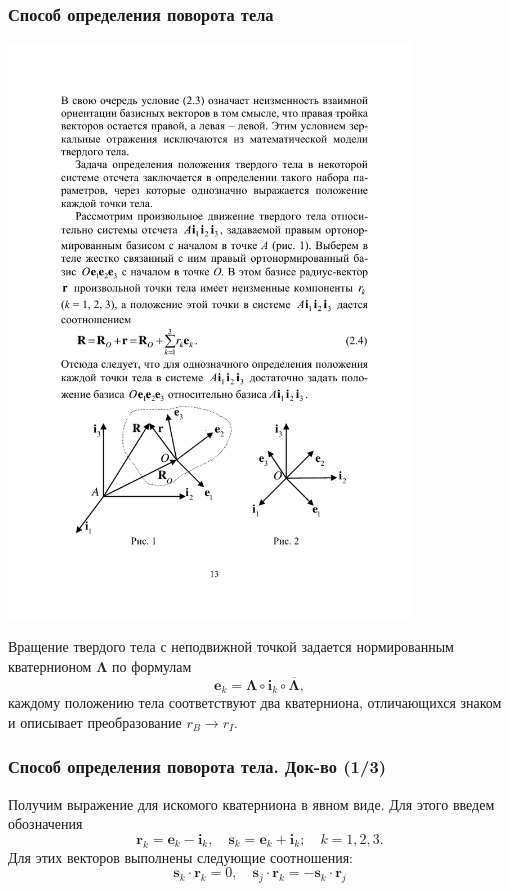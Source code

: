 \documentclass[utf8]{beamer}
\begin{document}
\begin{frame}
\frametitle{Способ определения поворота тела}
\begin{center}
\includegraphics[width=0.8\textwidth]{pic/BI_notations.pdf}
\end{center}
Вращение твердого тела с неподвижной точкой задается нормированным
кватернионом $\mathbf{\Lambda}$ по формулам
$$
\mathbf{e}_k =
\mathbf{\Lambda}\circ\mathbf{i}_k\circ\overline{\mathbf{\Lambda}},
$$
каждому положению тела соответствуют два кватерниона, отличающихся знаком и
описывает преобразование $r_B\rightarrow r_I$.
\end{frame}
\begin{frame}
\frametitle{Способ определения поворота тела. Док-во (1/3)}
Получим выражение для искомого кватерниона в явном виде. Для этого введем
обозначения
$$
\mathbf{r}_k = \mathbf{e}_k - \mathbf{i}_k,\quad \mathbf{s}_k = \mathbf{e}_k +
\mathbf{i}_k ;\quad k=1, 2, 3.
$$
Для этих векторов выполнены следующие соотношения:
$$
\mathbf{s}_k\cdot\mathbf{r}_k = 0, \quad \mathbf{s}_j\cdot\mathbf{r}_k =
-\mathbf{s}_k\cdot\mathbf{r}_j
$$
\end{frame}
\end{document}
